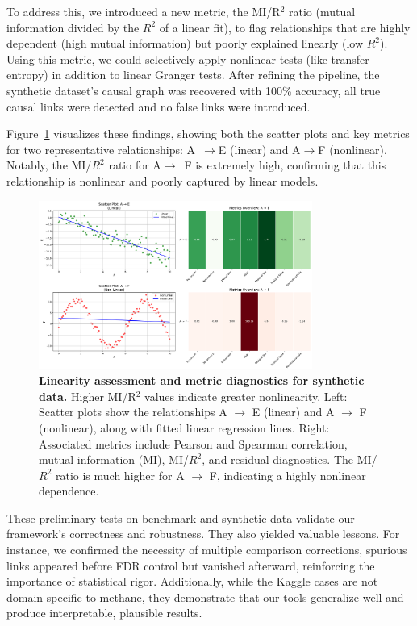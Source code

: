 To address this, we introduced a new metric, the MI/R$^2$ ratio (mutual information divided by the $R^2$ of a linear fit), to flag relationships that are highly dependent (high mutual information) but poorly explained linearly (low $R^2$). Using this metric, we could selectively apply nonlinear tests (like transfer entropy) in addition to linear Granger tests. After refining the pipeline, the synthetic dataset’s causal graph was recovered with 100\% accuracy, all true causal links were detected and no false links were introduced.

Figure~\ref{fig:synthetic} visualizes these findings, showing both the scatter plots and key metrics for two representative relationships: A~$\rightarrow$E (linear) and A$\rightarrow$F (nonlinear). Notably, the MI/$R^2$ ratio for A$\rightarrow$~F is extremely high, confirming that this relationship is nonlinear and poorly captured by linear models.

\begin{figure}[h!]
    \centering
    \includegraphics[width=0.8\textwidth]{Images/linearity_visualization.png}
    \caption[Linearity analysis of synthetic causal links]{\textbf{Linearity assessment and metric diagnostics for synthetic data.} Higher MI/R$^2$ values indicate greater nonlinearity. Left: Scatter plots show the relationships A $\rightarrow$ E (linear) and A $\rightarrow$ F (nonlinear), along with fitted linear regression lines. 
    Right: Associated metrics include Pearson and Spearman correlation, mutual information (MI), MI/$R^2$, and residual diagnostics. The MI/$R^2$ ratio is much higher for A $\rightarrow$ F, indicating a highly nonlinear dependence.}
    \label{fig:synthetic}
\end{figure}
    
These preliminary tests on benchmark and synthetic data validate our framework’s correctness and robustness. They also yielded valuable lessons. For instance, we confirmed the necessity of multiple comparison corrections, spurious links appeared before FDR control but vanished afterward, reinforcing the importance of statistical rigor. Additionally, while the Kaggle cases are not domain-specific to methane, they demonstrate that our tools generalize well and produce interpretable, plausible results.


